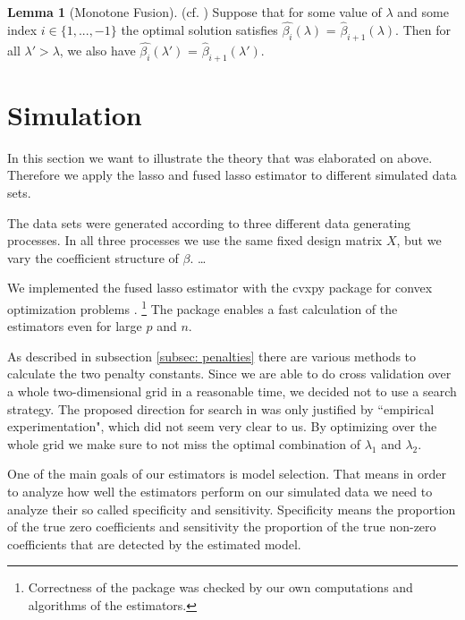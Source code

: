 \documentclass{article}
\theoremstyle{definition}
\newtheorem{lemma}[theorem]{Lemma}
\begin{document}
\begin{lemma}[Monotone Fusion] (cf. \citep{sparsity}) \label{monotone_fusion}
	Suppose that for some value of $\lambda$ and some index $i \in \{1, ..., -1 \}$ the optimal solution satisfies $\hat{\beta_i}(\lambda)$ = $\hat{\beta}_{i+1}(\lambda)$. Then for all $\lambda' > \lambda$, we also have $\hat{\beta_i}(\lambda')$ = $\hat{\beta}_{i+1}(\lambda')$.
\end{lemma}

\newpage
\section{Simulation}

In this section we want to illustrate the theory that was elaborated on above. Therefore we apply the lasso and fused lasso estimator to different simulated data sets.

The data sets were generated according to three different data generating processes. In all three processes we use the same fixed design matrix $X$, but we vary the coefficient structure of $\beta$. \ldots

We implemented the fused lasso estimator with the cvxpy package for convex optimization problems \citep{cvxpy}. \footnote{Correctness of the package was checked by our own computations and algorithms of the estimators.} The package enables a fast calculation of the estimators even for large $p$ and $n$.

As described in subsection \ref{subsec: penalties} there are various methods to calculate the two penalty constants. Since we are able to do cross validation over a whole two-dimensional grid in a reasonable time, we decided not to use a search strategy. The proposed direction for search in \citep{fused} was only justified by “empirical experimentation", which did not seem very clear to us. By optimizing over the whole grid we make sure to not miss the optimal combination of $\lambda_1$ and $\lambda_2$.

One of the main goals of our estimators is model selection. That means in order to analyze how well the estimators perform on our simulated data we need to analyze their so called specificity and sensitivity. Specificity means the proportion of the true zero coefficients and sensitivity the proportion of the true non-zero coefficients that are detected by the estimated model.



\newpage
\end{document}
